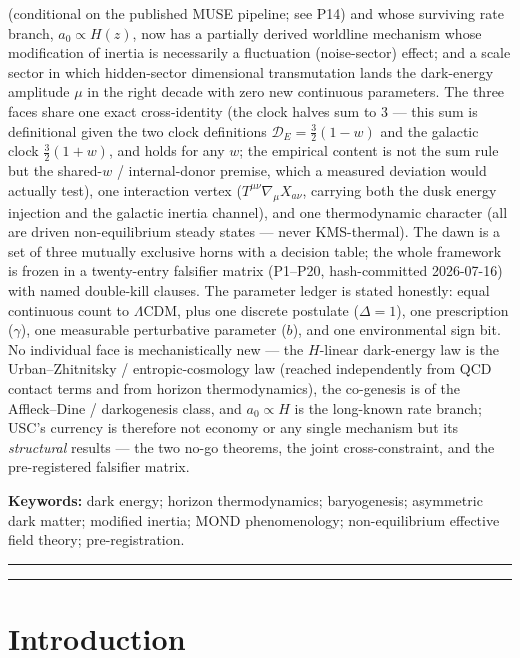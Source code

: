\documentclass[submission, Phys]{SciPost}
\begin{document}
{(conditional on the published MUSE pipeline; see P14) and whose
surviving rate branch, \(a_0 \propto H(z)\), now has a partially derived
worldline mechanism whose modification of inertia is necessarily a
fluctuation (noise-sector) effect; and a scale sector in which
hidden-sector dimensional transmutation lands the dark-energy amplitude
\(\mu\) in the right decade with zero new continuous parameters. The
three faces share one exact cross-identity (the clock halves sum to 3
--- this sum is definitional given the two clock definitions
\(\mathcal{D}_E = \tfrac{3}{2}(1-w)\) and the galactic clock
\(\tfrac{3}{2}(1+w)\), and holds for any \(w\); the empirical content is
not the sum rule but the shared-\(w\) / internal-donor premise, which a
measured deviation would actually test), one interaction vertex
(\(T^{\mu\nu}\nabla_\mu X_{a\nu}\), carrying both the dusk energy
injection and the galactic inertia channel), and one thermodynamic
character (all are driven non-equilibrium steady states --- never
KMS-thermal). The dawn is a set of three mutually exclusive horns with a
decision table; the whole framework is frozen in a twenty-entry
falsifier matrix (P1--P20, hash-committed 2026-07-16) with named
double-kill clauses. The parameter ledger is stated honestly: equal
continuous count to \(\Lambda\)CDM, plus one discrete postulate
(\(\Delta = 1\)), one prescription (\(\gamma\)), one measurable
perturbative parameter (\(b\)), and one environmental sign bit. No
individual face is mechanistically new --- the \(H\)-linear dark-energy
law is the Urban--Zhitnitsky / entropic-cosmology law (reached
independently from QCD contact terms and from horizon thermodynamics),
the co-genesis is of the Affleck--Dine / darkogenesis class, and
\(a_0 \propto H\) is the long-known rate branch; USC's currency is
therefore not economy or any single mechanism but its \emph{structural}
results --- the two no-go theorems, the joint cross-constraint, and the
pre-registered falsifier matrix.

\textbf{Keywords:} dark energy; horizon thermodynamics; baryogenesis;
asymmetric dark matter; modified inertia; MOND phenomenology;
non-equilibrium effective field theory; pre-registration.
}

\vspace{10pt}
\noindent\rule{\textwidth}{1pt}
\tableofcontents\thispagestyle{fancy}
\noindent\rule{\textwidth}{1pt}
\vspace{10pt}

\section{Introduction}\label{sec-1}
\end{document}
